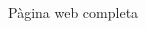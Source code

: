 \begin{spacing}{1.5}
\begin{figure}[H]
\begin{center}
\end{center}
\caption{Pàgina web completa}
\label{fig:4}
\end{figure}





\clearpage



\end{spacing}
